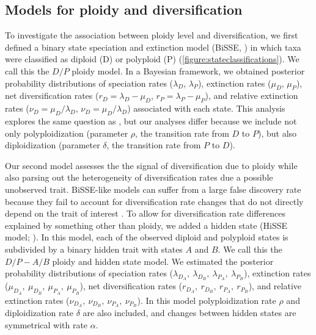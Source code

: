 
\subsection{Models for ploidy and diversification}

To investigate the association between ploidy level and diversification, we first defined a binary state speciation and extinction model (BiSSE, \citealt{maddison_2007}) in which taxa were classified as diploid (D) or polyploid (P) (\cref{figure:stateclassifications}).
We call this the $D/P$ ploidy model. 
In a Bayesian framework, we obtained posterior probability distributions of speciation rates ($\lambda_D$, $\lambda_P$), extinction rates ($\mu_D$, $\mu_P$), net diversification rates ($r_D=\lambda_D-\mu_D$, $r_P=\lambda_P-\mu_P$), and relative extinction rates ($\nu_D=\mu_D / \lambda_D$, $\nu_D=\mu_D / \lambda_D$) associated with each state.
This analysis explores the same question as \citet{mayrose_2011, mayrose_2015}, but our analyses differ because we include not only polyploidization (parameter $\rho$, the transition rate from $D$ to $P$), but also diploidization (parameter $\delta$, the transition rate from $P$ to $D$). %

Our second model assesses the the signal of diversification due to ploidy while also parsing out the heterogeneity of diversification rates due a possible unobserved trait.
BiSSE-like models can suffer from a large false discovery rate because they fail to account for diversification rate changes that do not directly depend on the trait of interest \citep{rabosky_2015, beaulieu_2016}.
To allow for diversification rate differences explained by something other than ploidy, we added a hidden state (HiSSE model; \citealt{beaulieu_2016}).
In this model, each of the observed diploid and polyploid states is subdivided by a binary hidden trait with states $A$ and $B$.
We call this the $D/P-A/B$ ploidy and hidden state model. 
We estimated the posterior probability distributions of speciation rates ($\lambda_{D_A},\ \lambda_{D_B},\ \lambda_{P_A},\ \lambda_{P_B}$), extinction rates ($\mu_{D_A},\ \mu_{D_B},\ \mu_{P_A},\ \mu_{P_B}$), net diversification rates ($r_{D_A},\ r_{D_B},\ r_{P_A},\ r_{P_B}$), and relative extinction rates ($\nu_{D_A},\ \nu_{D_B},\ \nu_{P_A},\ \nu_{P_B}$).
In this model polyploidization rate $\rho$ and diploidization rate $\delta$ are also included, and changes between hidden states are symmetrical with rate $\alpha$.

